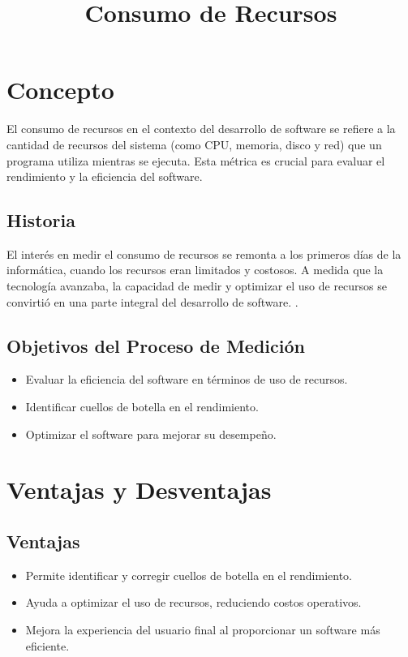 \documentclass{article}
\title{Consumo de Recursos}
\author{}
\date{}
\begin{document}
\maketitle

\section{Concepto}
El consumo de recursos en el contexto del desarrollo de software se refiere a la cantidad de recursos del sistema (como CPU, memoria, disco y red) que un programa utiliza mientras se ejecuta. Esta métrica es crucial para evaluar el rendimiento y la eficiencia del software. \cite{doe2018resource}

\subsection{Historia}
El interés en medir el consumo de recursos se remonta a los primeros días de la informática, cuando los recursos eran limitados y costosos. A medida que la tecnología avanzaba, la capacidad de medir y optimizar el uso de recursos se convirtió en una parte integral del desarrollo de software. \cite{fairley2014measuring}.

\subsection{Objetivos del Proceso de Medición}
\begin{itemize}
    \item Evaluar la eficiencia del software en términos de uso de recursos.
    \item Identificar cuellos de botella en el rendimiento.
    \item Optimizar el software para mejorar su desempeño.
\end{itemize}

\section{Ventajas y Desventajas}

\subsection{Ventajas}
\begin{itemize}
    \item Permite identificar y corregir cuellos de botella en el rendimiento.
    \item Ayuda a optimizar el uso de recursos, reduciendo costos operativos.
    \item Mejora la experiencia del usuario final al proporcionar un software más eficiente.
\end{itemize}
\end{document}

